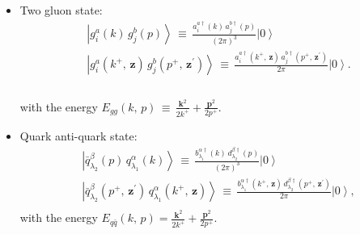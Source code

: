 \documentclass[aps,prd,amsmath,amssymb,nofootinbib]{revtex4-2}
\numberwithin{equation}{section}
\begin{document}
\begin{itemize}
For completeness we  note $E_{g}(k)=\frac{\mathbf{k}^{2}}{2k^{+}}.$ 
\item Two gluon state: 
  \begin{equation}\begin{split}\label{ggst}
&\left|g_{i}^{a}(k)\, g_{j}^{b}(p)\right\rangle \,\equiv\,\frac{a_{i}^{a\dagger}(k)\, a_{j}^{b\dagger}(p)}{(2\pi)^{3}}\left|0\right\rangle \qquad \\
&\left|g_{i}^{a}(k^{+},\,\mathbf{z})\, g_{j}^{b}(p^{+},\,\mathbf{z}^{\prime})\right\rangle \,\equiv\,\frac{a_{i}^{a\dagger}(k^{+},\,\mathbf{z})\, a_{j}^{b\dagger}(p^{+},\,\mathbf{z}^{\prime})}{2\pi}\left|0\right\rangle .\\
  \end{split}\end{equation}\\
  with the energy $E_{gg}(k,\, p)\,\equiv\,\frac{\mathbf{k}^{2}}{2k^{+}}+\frac{\mathbf{p}^{2}}{2p^{+}}$.\\
\item Quark anti-quark state:
  \begin{equation}
    \begin{split}
      \label{qqst}
    &\left|\bar{q}_{\lambda_{2}}^{\beta}(p)\, q_{\lambda_{1}}^{\alpha}(k)\right\rangle \,\equiv\,\frac{b_{\lambda_{1}}^{\alpha\dagger}(k)\, d_{\lambda_{2}}^{\beta\dagger}(p)}{(2\pi)^{3}}\left|0\right\rangle \quad\; \\
    &\left|\bar{q}_{\lambda_{2}}^{\beta}(p^{+},\,\mathbf{z}^{\prime})\, q_{\lambda_{1}}^{\alpha}(k^{+},\,\mathbf{z})\right\rangle \,\equiv\,\frac{b_{\lambda_{1}}^{\alpha\dagger}(k^{+},\,\mathbf{z})\, d_{\lambda_{2}}^{\beta\dagger}(p^{+},\,\mathbf{z}^{\prime})}{2\pi}\left|0\right\rangle ,\\
    \end{split}
  \end{equation}
  with the energy $E_{q\bar{q}}(k,\, p)=\frac{\mathbf{k}^{2}}{2k^{+}}+\frac{\mathbf{p}^{2}}{2p^{+}}$.

\end{itemize}
\newpage 
\end{document}
